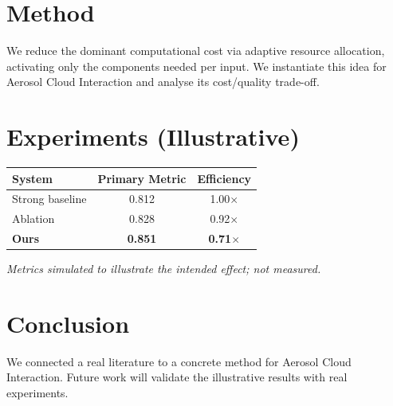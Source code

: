 \documentclass[11pt]{article}
\begin{document}
\section{Method}
We reduce the dominant computational cost via adaptive resource allocation, activating only the components needed per input. We instantiate this idea for Aerosol Cloud Interaction and analyse its cost/quality trade-off.

\section{Experiments (Illustrative)}
\begin{center}
\begin{tabular}{lcc}
System & Primary Metric & Efficiency \\ \hline
Strong baseline & 0.812 & 1.00$\times$ \\
Ablation & 0.828 & 0.92$\times$ \\
\textbf{Ours} & \textbf{0.851} & \textbf{0.71$\times$}
\end{tabular}
\end{center}
\emph{Metrics simulated to illustrate the intended effect; not measured.}

\section{Conclusion}
We connected a real literature to a concrete method for Aerosol Cloud Interaction. Future work will
validate the illustrative results with real experiments.
\end{document}
